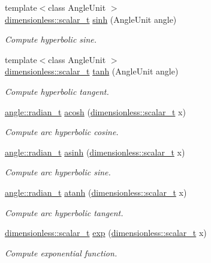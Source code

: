 \begin{DoxyCompactItemize}
{\footnotesize template$<$class Angle\+Unit $>$ }\\\hyperlink{classunits_1_1unit__t}{dimensionless\+::scalar\+\_\+t} \hyperlink{group___unit_math_ga7650a253c6b431cd5abda645bd3897a3}{sinh} (Angle\+Unit angle)
\begin{DoxyCompactList}\small\item\em Compute hyperbolic sine. \end{DoxyCompactList}\item 
{\footnotesize template$<$class Angle\+Unit $>$ }\\\hyperlink{classunits_1_1unit__t}{dimensionless\+::scalar\+\_\+t} \hyperlink{group___unit_math_ga3b2fce115a3d819ba7f51aa189838b73}{tanh} (Angle\+Unit angle)
\begin{DoxyCompactList}\small\item\em Compute hyperbolic tangent. \end{DoxyCompactList}\item 
\hyperlink{classunits_1_1unit__t}{angle\+::radian\+\_\+t} \hyperlink{group___unit_math_ga928dd73a4b74f453046147c6979628eb}{acosh} (\hyperlink{classunits_1_1unit__t}{dimensionless\+::scalar\+\_\+t} x)
\begin{DoxyCompactList}\small\item\em Compute arc hyperbolic cosine. \end{DoxyCompactList}\item 
\hyperlink{classunits_1_1unit__t}{angle\+::radian\+\_\+t} \hyperlink{group___unit_math_gae8f851e6ce59afb43363a1060df055e9}{asinh} (\hyperlink{classunits_1_1unit__t}{dimensionless\+::scalar\+\_\+t} x)
\begin{DoxyCompactList}\small\item\em Compute arc hyperbolic sine. \end{DoxyCompactList}\item 
\hyperlink{classunits_1_1unit__t}{angle\+::radian\+\_\+t} \hyperlink{group___unit_math_ga67f5920c8455673eff954191e2f1ab5b}{atanh} (\hyperlink{classunits_1_1unit__t}{dimensionless\+::scalar\+\_\+t} x)
\begin{DoxyCompactList}\small\item\em Compute arc hyperbolic tangent. \end{DoxyCompactList}\item 
\hyperlink{classunits_1_1unit__t}{dimensionless\+::scalar\+\_\+t} \hyperlink{group___unit_math_gaf2dcf51e16199a76191d15a3dc25b09e}{exp} (\hyperlink{classunits_1_1unit__t}{dimensionless\+::scalar\+\_\+t} x)
\begin{DoxyCompactList}\small\item\em Compute exponential function. \end{DoxyCompactList}\item 

\end{DoxyCompactItemize}
